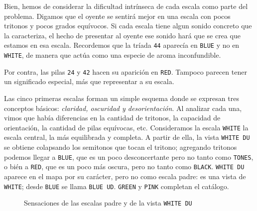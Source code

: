 \documentclass[]{report}
\begin{document}
Bien, hemos de considerar la dificultad intrínseca de cada escala como parte del problema. Digamos que el oyente se sentirá mejor en una escala con pocos tritonos y pocos grados equívocos. Si cada escala tiene algun sonido concreto que la caracteriza, el hecho de presentar al oyente ese sonido hará que se crea que estamos en esa escala. Recordemos que la tríada \texttt{44} aparecía en \texttt{BLUE} y no en \texttt{WHITE}, de manera que actúa como una especie de aroma inconfundible.

Por contra, las pilas \texttt{24} y \texttt{42} hacen su aparición en \texttt{RED}. Tampoco parecen tener un significado especial, más que representar a su escala.

Las cinco primeras escalas forman un simple esquema donde se expresan tres conceptos básicos: \emph{claridad, oscuridad y desorientación}. Al analizar cada una, vimos que había diferencias en la cantidad de tritonos, la capacidad de orientación, la cantidad de pilas equívocas, etc. Consideramos la escala \texttt{WHITE} la escala central, la más equilibrada y completa. A partir de ella, la vista \texttt{WHITE DU} se obtiene colapsando los semitonos que tocan el tritono; agregando tritonos podemos llegar a \texttt{BLUE}, que es un poco desconcertante pero no tanto como \texttt{TONES}, o bién a \texttt{RED}, que es un poco más oscura, pero no tanto como \texttt{BLACK}. \texttt{WHITE DU} aparece en el mapa por su carácter, pero no como escala padre: es una vista de \texttt{WHITE}; desde \texttt{BLUE} se llama \texttt{BLUE UD}. \texttt{GREEN} y \texttt{PINK} completan el catálogo.

\begin{figure}[H]
	\caption{Sensaciones de las escalas padre y de la vista \texttt{WHITE DU}}\label{tab:scale-sensation}
\end{figure}
\end{document}
